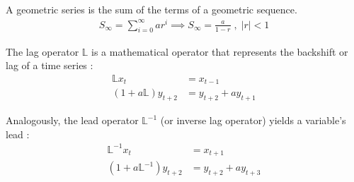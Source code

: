 \documentclass[../thesis.tex]{subfiles}
\begin{document}

\begin{definition}\label{def:geometric-series}
	
	A geometric series is the sum of the terms of a geometric sequence.
	\begin{align*}
		S_\infty = \sum_{i=0}^{\infty} ar^i \implies 
		S_\infty = \frac{a}{1-r} \; , \; |r| <1
	\end{align*}	
	
\end{definition}


\begin{definition}\label{def:lag-operator}
	The lag operator $\mathbb{L}$ is a mathematical operator that represents the backshift or lag of a time series \cite[Lecture 13, p.9]{solis-garcia_ucb_2022}:
	\begin{align*}
		\mathbb{L} x_t            & = x_{t-1}              \\
		(1 + a\mathbb{L})y_{t+2} & = y_{t+2} + ay_{t+1}
	\end{align*}
	
	Analogously, the lead operator $\mathbb{L}^{-1}$ (or inverse lag operator) yields a variable's lead \cite[Lecture 13, p.9]{solis-garcia_ucb_2022}:
	\begin{align*}
		\mathbb{L}^{-1} x_t            & = x_{t+1}              \\
		(1 + a\mathbb{L}^{-1}) y_{t+2} & = y_{t+2} + ay_{t+3}
	\end{align*}
\end{definition}
\end{document}
